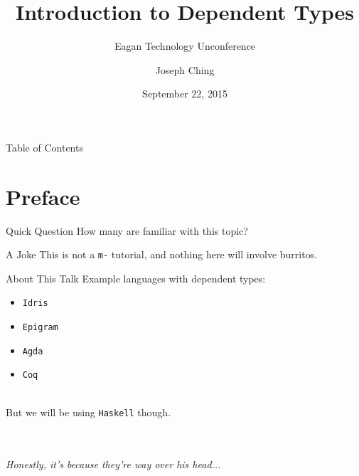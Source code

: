 \documentclass[xcolor={usenames,dvipsnames}]{beamer}
\title{Introduction to Dependent Types}
\subtitle{Eagan Technology Unconference}
\author{Joseph Ching}
\date{September 22, 2015}
\begin{document}
\begin{frame}[plain]
  \titlepage
\end{frame}


\begin{frame}{Table of Contents}
  \tableofcontents[
    pausesections,
    sectionstyle=show,
    subsectionstyle=hide
  ]
\end{frame}


\section{Preface}

\begin{frame}{Quick Question}
  How many are familiar with this topic?
\end{frame}

\begin{frame}{A Joke}
  This is not a \texttt{m-} tutorial, \pause and nothing here will involve burritos.
\end{frame}


\begin{frame}{About This Talk}
  Example languages with dependent types:
  \pause
  \begin{itemize}
    \item \texttt{Idris}
    \pause
    \item \texttt{Epigram}
    \pause
    \item \texttt{Agda}
    \pause
    \item \texttt{Coq}
  \end{itemize}

    \ \\
    \pause
    But we will be using \texttt{Haskell} though.

    \ \\
    \ \\
    \textit{\tiny{Honestly, it's because they're way over his head...}}\\
\end{frame}
\end{document}

